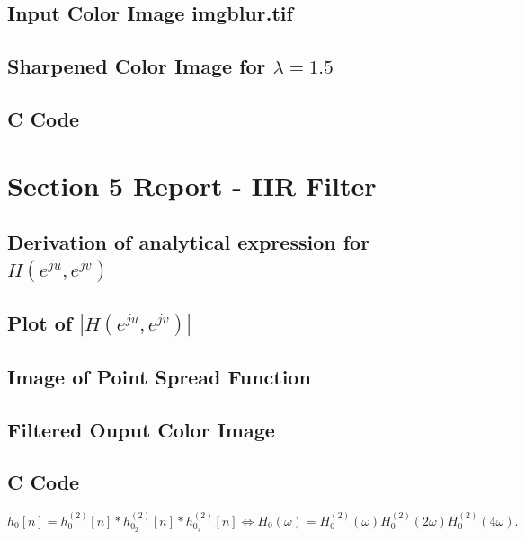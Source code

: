 \documentclass{article}
\begin{document}
\subsection{Input Color Image imgblur.tif}
\subsection{Sharpened Color Image for $\lambda = 1.5$}
\subsection{C Code}

\section{Section 5 Report - IIR Filter}
\subsection{Derivation of analytical expression for $H(e^{ju}, e^{jv})$}
\subsection{Plot of $|H(e^{ju}, e^{jv})|$}
\subsection{Image of Point Spread Function}
\subsection{Filtered Ouput Color Image}
\subsection{C Code}
\begin{equation*}
    h_0[n] = h_{0}^{(2)}[n] \ast h_{0_2}^{(2)}[n] \ast h_{0_4}^{(2)}[n] \iff H_0(\omega) = H_0^{(2)}(\omega)H_0^{(2)}(2\omega)H_0^{(2)}(4\omega).
\end{equation*}
\end{document}
